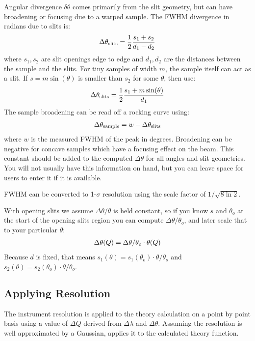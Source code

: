\documentclass[letterpaper,10pt,english]{sphinxmanual}
\begin{document}
Angular divergence $\delta \theta$ comes primarily from the slit geometry,
but can have broadening or focusing due to a warped sample.  The FWHM
divergence in radians due to slits is:
\begin{gather}
\begin{split}\Delta\theta_{\rm slits} = \frac{1}{2} \frac{s_1 + s_2}{d_1 - d_2}\end{split}\notag
\end{gather}
where $s_1,s_2$ are slit openings edge to edge and $d_1,d_2$ are the distances
between the sample and the slits.  For tiny samples of width $m$, the sample
itself can act as a slit.  If $s = m \sin(\theta)$ is smaller than $s_2$ for
some $\theta$, then use:
\begin{gather}
\begin{split}\Delta\theta_{\rm slits} = \frac{1}{2} \frac{s_1 + m \sin(\theta)}{d_1}\end{split}\notag
\end{gather}
The sample broadening can be read off a rocking curve using:
\begin{gather}
\begin{split}\Delta\theta_{\rm sample} = w - \Delta\theta_{\rm slits}\end{split}\notag
\end{gather}
where $w$ is the measured FWHM of the peak in degrees. Broadening can be
negative for concave samples which have a focusing effect on the beam.  This
constant should be added to the computed $\Delta \theta$ for all angles and
slit geometries.  You will not usually have this information on hand, but
you can leave space for users to enter it if it is available.

FWHM can be converted to 1-$\sigma$ resolution using the scale factor of
$1/\sqrt{8 \ln 2}$.

With opening slits we assume $\Delta \theta/\theta$ is held constant, so if
you know $s$ and $\theta_o$ at the start of the opening slits region you
can compute $\Delta \theta/\theta_o$, and later scale that to your
particular $\theta$:
\begin{gather}
\begin{split}\Delta\theta(Q) = \Delta\theta/\theta_o \cdot \theta(Q)\end{split}\notag
\end{gather}
Because $d$ is fixed, that means
$s_1(\theta) = s_1(\theta_o) \cdot \theta/\theta_o$ and
$s_2(\theta) = s_2(\theta_o) \cdot \theta/\theta_o$.


\subsection{Applying Resolution}
\label{guide/data:applying-resolution}\label{guide/data:data-resolution-calculator}
The instrument resolution is applied to the theory calculation on
a point by point basis using a value of $\Delta Q$ derived from
$\Delta\lambda$ and $\Delta\theta$.   Assuming the resolution is
well approximated by a Gaussian,
{\hyperref[api/reflectivity:refl1d.reflectivity.convolve]{}} applies it to the
calculated theory function.
\end{document}
